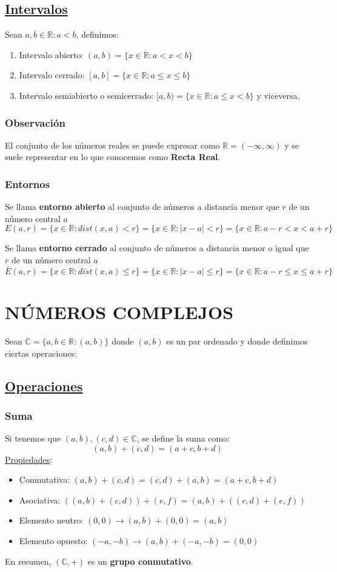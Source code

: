 \documentclass[10pt,a4paper,openright]{book}
\theoremstyle{break}
\begin{document}
\subsection{\underline{Intervalos}}
Sean $a,b\in \mathbb R: a<b$, definimos:
\begin{enumerate}
\item Intervalo abierto: $(a,b)=\{x\in \mathbb R: a<x<b\}$
\item Intervalo cerrado: $[a,b]=\{x\in \mathbb R: a\leq x\leq b\}$
\item Intervalo semiabierto o semicerrado: $[a,b)=\{x\in \mathbb R: a\leq x<b\}$ y viceversa.
\end{enumerate}

\subsubsection{Observación}
El conjunto de los números reales se puede expresar como $\mathbb R=(-\infty,\infty)$ y se suele representar en lo que conocemos como \textbf{Recta Real}.

\subsubsection{Entornos}
Se llama \textbf{entorno abierto} al conjunto de números a distancia menor que $r$ de un número central $a$
$$E(a,r)=\{x\in \mathbb R : dist(x,a)<r\}=\{x\in \mathbb R :|x-a|<r\}=\{x\in \mathbb R :a-r<x<a+r\}$$

Se llama \textbf{entorno cerrado} al conjunto de números a distancia menor o igual que $r$ de un número central $a$
$$\bar{E}(a,r)=\{x\in \mathbb R : dist(x,a)\leq r\}=\{x\in \mathbb R :|x-a|\leq r\}=\{x\in \mathbb R :a-r\leq x\leq a+r\}$$

\section{NÚMEROS COMPLEJOS}
Sean $\mathbb C=\{a,b\in \mathbb R: (a,b)\}$ donde $(a,b)$ es un par ordenado y donde definimos ciertas operaciones:
\subsection{\underline{Operaciones}}
\subsubsection{Suma}
Si tenemos que $(a,b),(c,d)\in \mathbb C$, se define la suma como:
$$(a,b)+(c,d)=(a+c,b+d)$$
\underline{Propiedades}:
\begin{itemize}
\item Conmutativa: $(a,b)+(c,d)=(c,d)+(a,b)=(a+c,b+d)$
\item Asociativa: $\left((a,b)+(c,d)\right)+(e,f)=(a,b)+\left((c,d)+(e,f)\right)$
\item Elemento neutro: $(0,0)\rightarrow (a,b)+(0,0)=(a,b)$
\item Elemento opuesto: $(-a,-b)\rightarrow (a,b)+(-a,-b)=(0,0)$
\end{itemize}
En resumen, $(\mathbb C, +)$ es un \textbf{grupo conmutativo}.
\end{document}

